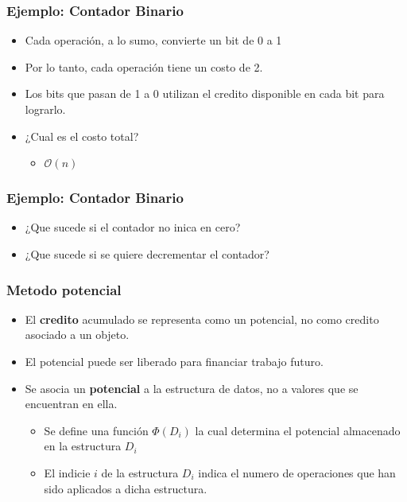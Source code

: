 \documentclass{beamer}
\begin{document}
\begin{frame}
    \frametitle{Ejemplo: Contador Binario}
    \begin{itemize}
        \item{Cada operaci\'on, a lo sumo, convierte un bit de 0 a 1}
        \item{Por lo tanto, cada operaci\'on tiene un costo de 2.}
        \item{Los bits que pasan de 1 a 0 utilizan el credito disponible en cada
        bit para lograrlo.}
        \item{¿Cual es el costo total?
        \begin{itemize}
            \item{$\mathcal{O}(n)$}
        \end{itemize}
        }
    \end{itemize}
\end{frame}

\begin{frame}
    \frametitle{Ejemplo: Contador Binario}
    \begin{itemize}
        \item{¿Que sucede si el contador no inica en cero?}
        \item{¿Que sucede si se quiere decrementar el contador?}
    \end{itemize}
\end{frame}

\begin{frame}
\frametitle{Metodo potencial}
\begin{itemize}
    \item{El {\bf credito} acumulado se representa como un potencial,
    no como credito asociado a un objeto.}
    \item{El potencial puede ser liberado para financiar trabajo
    futuro.}
    \item{Se asocia un {\bf potencial} a la estructura de datos,
    no a valores que se encuentran en ella.
    \begin{itemize}
        \item{Se define una funci\'on $\Phi(D_i)$ la cual determina
        el potencial almacenado en la estructura $D_i$}
        \item{El indicie $i$ de la estructura $D_i$ indica el
        numero de operaciones que han sido aplicados a dicha
        estructura.}
    \end{itemize}
    }
\end{itemize}

\end{frame}
\end{document}
